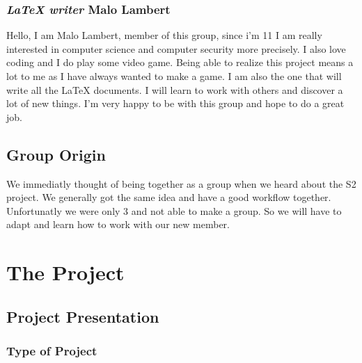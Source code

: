 \documentclass[a4paper, 11pt] {article}
\newcommand{\latex}{\LaTeX\xspace}
\begin{document}
    \subsubsection*{\textit{\latex writer} Malo Lambert}

    \par
    Hello, I am Malo Lambert, member of this group, since i'm 11 I am really interested in computer science and computer security more precisely. I also love coding and I do play some
    video game. Being able to realize this project means a lot to me as I have always wanted to make a game. I am also the one that will write all the \latex documents. I will learn to work with others and discover a lot of new things. I'm very happy to be with this group and hope to do a great job.
    \newline


\subsection{Group Origin}

\par
We immediatly thought of being together as a group when we heard about the S2 project.
We generally got the same idea and have a good workflow together. Unfortunatly we were
only 3 and not able to make a group. So we will have to adapt and learn how to work with
our new member.
\newline



\newpage
\section{The Project}

    \subsection{Project Presentation}

    \subsubsection{Type of Project}
\end{document}
